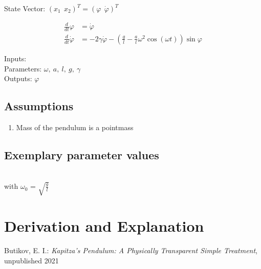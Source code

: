 \documentclass[10pt,a4paper]{article}
\begin{document}
	State Vector: $(x_1~~ x_2)^T = (\varphi~~ \dot{\varphi})^T$
	
	\begin{subequations}
	\begin{align}
		\frac{d}{dt} \varphi &= \dot{\varphi} \\
		\frac{d}{dt} \dot{\varphi} &= -2\gamma \dot{\varphi} - \left(\frac{g}{l} - \frac{a}{l}\omega^2\cos(\omega t)\right)\sin\varphi
	\end{align}
	\end{subequations}

	\noindent
	Inputs: 
	\\
	Parameters: $\omega,~ a, ~l, ~g, ~\gamma$ %
	\\
	Outputs: $\varphi$ %
	
	
	\subsection{Assumptions} %
		\begin{enumerate} %
			\item Mass of the pendulum is a pointmass 
		\end{enumerate}
	
	
	\subsection{Exemplary parameter values}
	
	\\
	with $\omega_0$ = $\sqrt{\frac{g}{l}}$

	
	\section{Derivation and Explanation} %
	
	
	\begin{thebibliography}{10}		
		Butikov, E. I.: 
		\textit{Kapitza’s Pendulum: A Physically Transparent Simple Treatment}, unpublished 2021
	\end{thebibliography}
\end{document}
